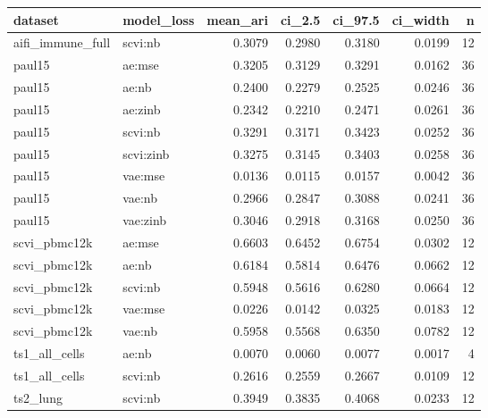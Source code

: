 \begin{tabular}{llrrrrr}
\toprule
dataset & model\_loss & mean\_ari & ci\_2.5 & ci\_97.5 & ci\_width & n \\
\midrule
aifi\_immune\_full & scvi:nb & 0.3079 & 0.2980 & 0.3180 & 0.0199 & 12 \\
paul15 & ae:mse & 0.3205 & 0.3129 & 0.3291 & 0.0162 & 36 \\
paul15 & ae:nb & 0.2400 & 0.2279 & 0.2525 & 0.0246 & 36 \\
paul15 & ae:zinb & 0.2342 & 0.2210 & 0.2471 & 0.0261 & 36 \\
paul15 & scvi:nb & 0.3291 & 0.3171 & 0.3423 & 0.0252 & 36 \\
paul15 & scvi:zinb & 0.3275 & 0.3145 & 0.3403 & 0.0258 & 36 \\
paul15 & vae:mse & 0.0136 & 0.0115 & 0.0157 & 0.0042 & 36 \\
paul15 & vae:nb & 0.2966 & 0.2847 & 0.3088 & 0.0241 & 36 \\
paul15 & vae:zinb & 0.3046 & 0.2918 & 0.3168 & 0.0250 & 36 \\
scvi\_pbmc12k & ae:mse & 0.6603 & 0.6452 & 0.6754 & 0.0302 & 12 \\
scvi\_pbmc12k & ae:nb & 0.6184 & 0.5814 & 0.6476 & 0.0662 & 12 \\
scvi\_pbmc12k & scvi:nb & 0.5948 & 0.5616 & 0.6280 & 0.0664 & 12 \\
scvi\_pbmc12k & vae:mse & 0.0226 & 0.0142 & 0.0325 & 0.0183 & 12 \\
scvi\_pbmc12k & vae:nb & 0.5958 & 0.5568 & 0.6350 & 0.0782 & 12 \\
ts1\_all\_cells & ae:nb & 0.0070 & 0.0060 & 0.0077 & 0.0017 & 4 \\
ts1\_all\_cells & scvi:nb & 0.2616 & 0.2559 & 0.2667 & 0.0109 & 12 \\
ts2\_lung & scvi:nb & 0.3949 & 0.3835 & 0.4068 & 0.0233 & 12 \\
\bottomrule
\end{tabular}
